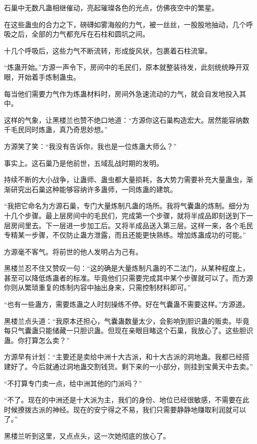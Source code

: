 \begin{this_body}
石巢中无数凡蛊相继催动，亮起璀璨各色的光点，仿佛夜空中的繁星。

在这些蛊虫的合力之下，磅礴如雾海般的力气，被一丝丝，一股股地抽动，几个呼吸之后，全部的力气都充斥在石柱和圆坑之间。

十几个呼吸后，这些力气不断流转，形成旋风状，包裹着石柱流窜。

“炼蛊开始。”方源一声令下，房间中的毛民们，原本就整装待发，此刻统统睁开双眼，开始着手炼制蛊虫。

每当他们需要力气作为炼蛊材料时，房间外急速流动的力气，就会自发地投入其中。

这样的气象，让黑楼兰也赞不绝口地道：“方源你这石巢构造宏大。居然能容纳数千毛民同时炼蛊，真乃奇思妙想。”

方源笑了笑：“我没有告诉你，我也是一位炼蛊大师么？”

事实上。这石巢乃是他前世，五域乱战时期的发明。

持续不断的大小战争，让蛊师、蛊虫都大量损耗，各大势力需要补充大量蛊虫，渐渐研究出石巢这种能够容纳许多蛊师，一同炼蛊的建筑。

“我把它命名为方源石巢，专门大量炼制凡蛊的场所。我将气囊蛊的炼制。细分为十几个步骤。最上层房间中的毛民们，完成第一个步骤，就将半成品即刻送到下一层房间里去。下一层进一步加工后。又将半成品送入第三层。这样一来，各个毛民专精某一步骤，不仅防止蛊方泄露，而且还能更快熟练。增加炼蛊成功的可能。”

方源毫不客气。将前世的他人发明占为己有。

黑楼兰忍不住又赞叹一句：“这的确是大量炼制凡蛊的不二法门，从某种程度上，甚至可以降低炼蛊者的标准。毕竟他们只需要完成其中某个步骤就可以了。而方源你则从繁琐重复的炼制内容中抽出身来，只需控制材料即可。”

“也有一些蛊方，需要炼蛊之人时刻操练不停。好在气囊蛊不需要这样。”方源道。

黑楼兰点头道：“我原本还担心，气囊蛊数量太少，会影响到胆识蛊的贩卖。毕竟每只气囊蛊只能储藏一只胆识蛊。但现在亲眼目睹这个石巢，我放心了。这些胆识蛊。你打算怎么卖？”

方源早有计划：“主要还是卖给中洲十大古派，和十大古派的洞地蛊。我都已经搭建好了。今后就通过洞地蛊交割钱货。剩下来的一小部分，则挂到宝黄天中去卖。”

“不打算专门卖一点，给中洲其他的门派吗？”

“不了。现在的中洲还是十大派为主，我们的身份、地位已经很敏感，不需要在此时候撩拨古派的神经。现在的安宁得之不易，我们只需要静静地赚取利润就可以了。”

黑楼兰听到这里，又点点头，这一次她彻底的放心了。


\end{this_body}
